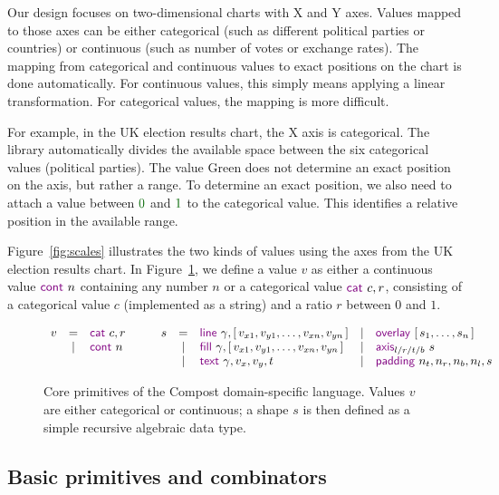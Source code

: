 \documentclass{jfp}
\newcommand{\num}[1]{\textcolor{numclr}{#1}}
\newcommand{\strf}[1]{\textnormal{\textcolor{strclr}{\sffamily #1}}}
\newcommand{\kvd}[1]{\textnormal{\textcolor{kvdclr}{\sffamily #1}}}
\begin{document}
Our design focuses on two-dimensional charts with X and Y axes. Values mapped to those axes
can be either categorical (such as different political parties or countries) or continuous
(such as number of votes or exchange rates). The mapping from categorical and continuous values
to exact positions on the chart is done automatically. For continuous values, this simply means
applying a linear transformation. For categorical values, the mapping is more difficult.

For example, in the UK election results chart, the X axis is categorical. The library automatically
divides the available space between the six categorical values (political parties). The value
\strf{Green} does not determine an exact position on the axis, but rather a range. To determine
an exact position, we also need to attach a value between $\num{0}$ and $\num{1}$ to the
categorical value. This identifies a relative position in the available range.

Figure~\ref{fig:scales} illustrates the two kinds of values using the axes from the UK
election results chart. In Figure~\ref{fig:shape}, we define a value $v$ as either a continuous value
$\kvd{cont}~n$ containing any number $n$ or a categorical value $\kvd{cat}~c, r$, consisting
of a categorical value $c$ (implemented as a string) and a ratio $r$ between $0$ and $1$.
%
\begin{figure}
\begin{equation*}
\begin{array}{rcl}
v & = & \kvd{cat}~c, r \\
  & | & \kvd{cont}~n\\
  ~
\end{array}
\qquad
\begin{array}{rclcl}
s & = &\kvd{line}~\gamma, [\,v_{x1}, v_{y1}, \ldots, v_{xn}, v_{yn}\,] & | & \kvd{overlay}~[\,s_1, \ldots, s_n\,]\\
 & | & \kvd{fill}~\gamma, [\,v_{x1}, v_{y1}, \ldots, v_{xn}, v_{yn}\,] & | &\kvd{axis}_{l/r/t/b}~s\\
 & | & \kvd{text}~\gamma, v_x, v_y, t & | &\kvd{padding}~n_t,n_r,n_b,n_l,s
\end{array}
\end{equation*}
\caption{Core primitives of the Compost domain-specific language. Values $v$ are either categorical
  or continuous; a shape $s$ is then defined as a simple recursive algebraic data type.}
\label{fig:shape}
\end{figure}

\subsection{Basic primitives and combinators}
\end{document}
